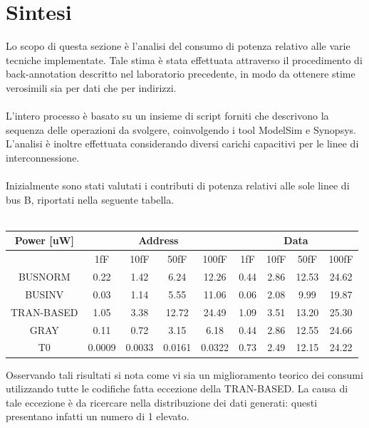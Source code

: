 \documentclass[11pt,  english, makeidx, a4paper, titlepage, oneside]{book}
\begin{document}
\section{Sintesi}
Lo scopo di questa sezione è l'analisi del consumo di potenza relativo alle varie tecniche implementate. Tale stima è stata effettuata attraverso il procedimento di back-annotation descritto nel laboratorio precedente, in modo da ottenere stime verosimili sia per dati che per indirizzi.
\\\\
L'intero processo è basato su un insieme di script forniti che descrivono la sequenza delle operazioni da svolgere, coinvolgendo i tool ModelSim e Synopsys. L'analisi è inoltre effettuata considerando diversi carichi capacitivi per le linee di interconnessione.
\\\\
Inizialmente sono stati valutati i contributi di potenza relativi alle sole linee di bus B, riportati nella seguente tabella.
\\\\
\begin{center}
	\begin{tabular}{|c|c|c|c|c||c|c|c|c|}
	\hline
	Power [uW] & \multicolumn{4}{c}{Address} & \multicolumn{4}{c}{Data}\\
	\hline
	 & 1fF & 10fF & 50fF & 100fF & 1fF & 10fF & 50fF & 100fF \\
	\hline
	BUSNORM & 0.22 & 1.42 & 6.24 & 12.26 & 0.44 & 2.86 & 12.53 & 24.62 \\
	 \hline
	BUSINV & 0.03 & 1.14 & 5.55 & 11.06 & 0.06 & 2.08 & 9.99 & 19.87 \\
	\hline
	TRAN-BASED & 1.05 & 3.38 & 12.72 & 24.49 & 1.09 & 3.51 & 13.20 & 25.30 \\
	\hline
	GRAY & 0.11 & 0.72 & 3.15 & 6.18 & 0.44 & 2.86 & 12.55 & 24.66 \\
	\hline
	T0 & 0.0009 & 0.0033 & 0.0161 & 0.0322 & 0.73 & 2.49 & 12.15 & 24.22 \\
	\hline
	\end{tabular}	
\end{center}
\vspace{0.3cm}
Osservando tali risultati si nota come vi sia un miglioramento teorico dei consumi utilizzando tutte le codifiche fatta eccezione della TRAN-BASED. La causa di tale eccezione è da ricercare nella distribuzione dei dati generati: questi presentano infatti un numero di 1 elevato.
\\\\
\end{document}
